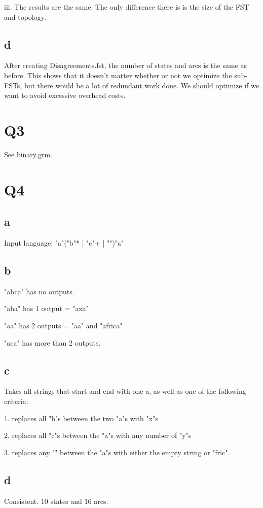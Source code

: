 \documentclass[12pt, letterpaper]{article}
\begin{document}
iii. The results are the same. The only difference there is is the size of the FST and topology.

\subsection{d}

After creating Disagreements.fst, the number of states and arcs is the same as before. This shows that it doesn't matter whether or not we optimize the sub-FSTs, but there would be a lot of redundant work done. We should optimize if we want to avoid excessive overhead costs.

\section{Q3}
See binary.grm.

\section{Q4}
\subsection{a}
Input language: "a"("b"* | "c"+ | "")"a"

\subsection{b}
"abca" has no outputs.

"aba" has 1 output = "axa"

"aa" has 2 outputs = "aa" and "africa"

"aca" has more than 2 outputs.

\subsection{c}
Takes all strings that start and end with one a, as well as one of the following criteria:

1. replaces all "b"s between the two "a"s with "x"s 

2. replaces all "c"s between the "a"s with any number of "y"s

3. replaces any "" between the "a"s with either the empty string or "fric". 

\subsection{d}
Consistent. 10 states and 16 arcs.
\end{document}

